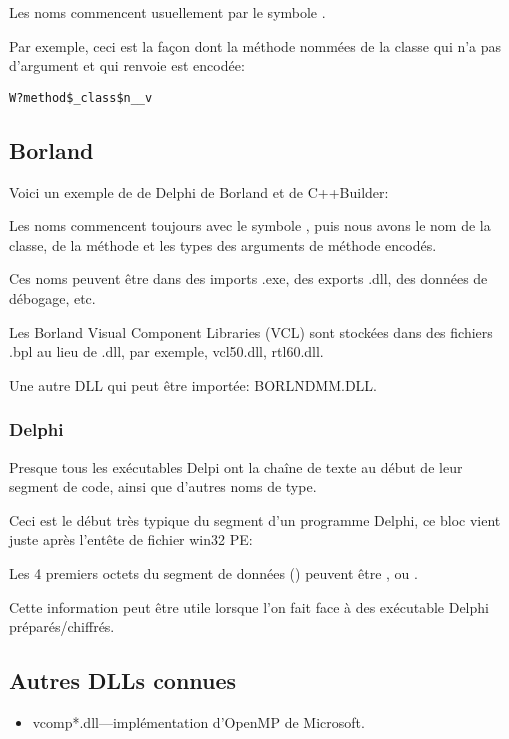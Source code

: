 Les noms commencent usuellement par le symbole .

Par exemple, ceci est la façon dont la méthode nommées  de la classe 
qui n'a pas d'argument et qui renvoie \Tvoid est encodée:

\begin{lstlisting}
W?method$_class$n__v
\end{lstlisting}

\subsection{Borland}

Voici un exemple de  de Delphi de Borland
et de C++Builder:



Les noms commencent toujours avec le symbole , puis nous avons le nom de la
classe, de la méthode et les types des arguments de méthode encodés.

Ces noms peuvent être dans des imports .exe, des exports .dll, des données de débogage,
etc.

Les Borland Visual Component Libraries (VCL) sont stockées dans des fichiers .bpl
au lieu de .dll, par exemple, vcl50.dll, rtl60.dll.

Une autre DLL qui peut être importée: BORLNDMM.DLL.

\subsubsection{Delphi}

Presque tous les exécutables Delpi ont la chaîne de texte  au début de
leur segment de code, ainsi que d'autres noms de type.

Ceci est le début très typique du segment  d'un programme Delphi, ce bloc
vient juste après l'entête de fichier win32 PE:



Les 4 premiers octets du segment de données () peuvent être ,
 ou .%

Cette information peut être utile lorsque l'on fait face à des exécutable Delphi
préparés/chiffrés.

\subsection{Autres DLLs connues}

\begin{itemize}
\item vcomp*.dll---implémentation d'OpenMP de Microsoft.
\end{itemize}

